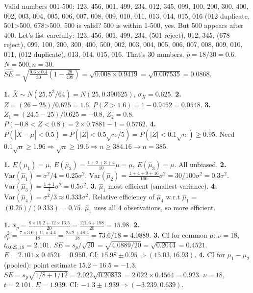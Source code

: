 \documentclass[11pt]{article}
\begin{document}
\begin{corrige}
Valid numbers 001-500: 123, 456, 001, 499, 234, 012, 345, 099, 100, 200, 300, 400, 002, 003, 004, 005, 006, 007, 008, 009, 010, 011, 013, 014, 015, 016 (012 duplicate, 501>500, 678>500, 500 is valid? 500 is within 1-500, yes. But 500 appears after 400. Let's list carefully: 123, 456, 001, 499, 234, (501 reject), 012, 345, (678 reject), 099, 100, 200, 300, 400, 500, 002, 003, 004, 005, 006, 007, 008, 009, 010, 011, (012 duplicate), 013, 014, 015, 016. That's 30 numbers. $\hat{p}=18/30=0.6$. $N=500, n=30$. $\widehat{SE} = \sqrt{\frac{0.6\times0.4}{30}(1-\frac{29}{499})} = \sqrt{0.008 \times 0.9419} = \sqrt{0.007535} = 0.0868$.
\end{corrige}

\begin{corrige}
\textbf{1.} $\bar{X} \sim N(25, 5^2/64) = N(25, 0.390625)$, $\sigma_{\bar{X}}=0.625$.
\textbf{2.} $Z = (26-25)/0.625 = 1.6$. $P(Z>1.6) = 1-0.9452 = 0.0548$.
\textbf{3.} $Z_1 = (24.5-25)/0.625 = -0.8$, $Z_2 = 0.8$. $P(-0.8<Z<0.8) = 2\times0.7881-1 = 0.5762$.
\textbf{4.} $P(|\bar{X}-\mu|<0.5) = P(|Z| < 0.5\sqrt{n}/5) = P(|Z| < 0.1\sqrt{n}) \ge 0.95$. Need $0.1\sqrt{n} \ge 1.96 \Rightarrow \sqrt{n} \ge 19.6 \Rightarrow n \ge 384.16 \to n=385$.
\end{corrige}

\begin{corrige}
\textbf{1.} $E(\hat{\mu}_1)=\mu$, $E(\hat{\mu}_2)=\frac{1+2+3+4}{10}\mu=\mu$, $E(\hat{\mu}_3)=\mu$. All unbiased.
\textbf{2.} $\mathrm{Var}(\hat{\mu}_1)=\sigma^2/4=0.25\sigma^2$. $\mathrm{Var}(\hat{\mu}_2)=\frac{1+4+9+16}{100}\sigma^2 = 30/100\sigma^2=0.3\sigma^2$. $\mathrm{Var}(\hat{\mu}_3)=\frac{1+1}{4}\sigma^2=0.5\sigma^2$.
\textbf{3.} $\hat{\mu}_1$ most efficient (smallest variance).
\textbf{4.} $\mathrm{Var}(\hat{\mu}_4)=\sigma^2/3 \approx 0.333\sigma^2$. Relative efficiency of $\hat{\mu}_4$ w.r.t $\hat{\mu}_1$ = $(0.25)/(0.333) = 0.75$. $\hat{\mu}_1$ uses all 4 observations, so more efficient.
\end{corrige}

\begin{corrige}
\textbf{1.} $\bar{x}_p = \frac{8\times15.2 + 12\times16.5}{20} = \frac{121.6+198}{20} = 15.98$.
\textbf{2.} $s_p^2 = \frac{7\times3.6 + 11\times4.4}{18} = \frac{25.2+48.4}{18} = 73.6/18 = 4.0889$.
\textbf{3.} CI for common $\mu$: $\nu=18$, $t_{0.025,18}=2.101$. $SE = s_p/\sqrt{20} = \sqrt{4.0889/20} = \sqrt{0.2044} = 0.4521$. $E=2.101\times0.4521=0.950$. CI: $15.98 \pm 0.95 \Rightarrow (15.03, 16.93)$.
\textbf{4.} CI for $\mu_1-\mu_2$ (pooled): point estimate $15.2-16.5=-1.3$. $SE = s_p\sqrt{1/8+1/12} = 2.022\sqrt{0.20833} = 2.022\times0.4564 = 0.923$. $\nu=18$, $t=2.101$. $E=1.939$. CI: $-1.3 \pm 1.939 \Rightarrow (-3.239, 0.639)$.
\end{corrige}
\end{document}
